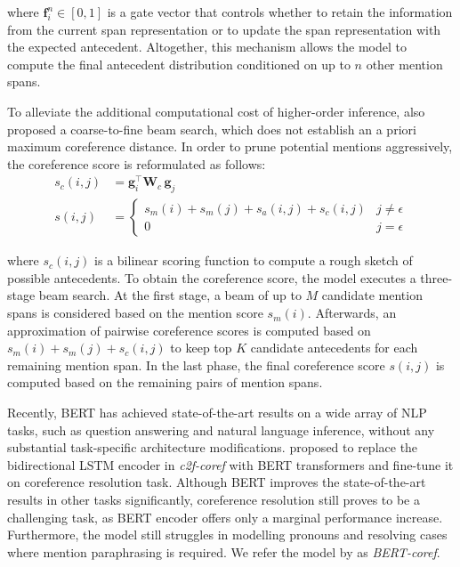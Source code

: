 \documentclass[11pt]{article}
\begin{document}
where $\pmb{f}_{i}^{n} \in [0,1]$ is a gate vector that controls whether to retain the information from the current span representation or to update the span representation with the expected antecedent. Altogether, this mechanism allows the model to compute the final antecedent distribution conditioned on up to $n$ other mention spans. 

To alleviate the additional computational cost of higher-order inference, \textcite{lee2018higher} also proposed a coarse-to-fine beam search, which does not establish an a priori maximum coreference distance. In order to prune potential mentions aggressively, the coreference score is reformulated as follows:
\begin{align}
s_{c}(i, j) &= \pmb{g}_{i}^{\top}\textbf{W}_{c}\, \pmb{g}_{j}\\
s(i, j) &= \begin{cases}
s_{m}(i) + s_{m}(j) + s_{a}(i, j) + s_{c}(i, j) & j \neq \epsilon \\
0 & j = \epsilon
\end{cases}
\end{align}

where $s_{c}(i, j)$ is a bilinear scoring function to compute a rough sketch of possible antecedents. To obtain the coreference score, the model executes a three-stage beam search. At the first stage, a beam of up to $M$ candidate mention spans is considered based on the mention score $s_{m}(i)$. Afterwards, an approximation of pairwise coreference scores is computed based on $s_{m}(i) + s_{m}(j) + s_{c}(i, j)$ to keep top $K$ candidate antecedents for each remaining mention span. In the last phase, the final coreference score $s(i, j)$ is computed based on the remaining pairs of mention spans.

Recently, BERT \parencite{devlin2019bert} has achieved state-of-the-art results on a wide array of NLP tasks, such as question answering and natural language inference, without any substantial task-specific architecture modifications. \textcite{joshi2019coref} proposed to replace the bidirectional LSTM encoder in \textit{c2f-coref} with BERT transformers and fine-tune it on coreference resolution task. Although BERT improves the state-of-the-art results in other tasks significantly, coreference resolution still proves to be a challenging task, as BERT encoder offers only a marginal performance increase. Furthermore, the model still struggles in modelling pronouns and resolving cases where mention paraphrasing is required. We refer the model by \textcite{joshi2019coref} as \textit{BERT-coref}.
\end{document}
